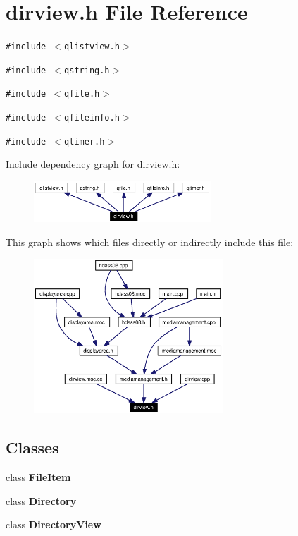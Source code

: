 \section{dirview.h File Reference}
\label{dirview_8h}


{\tt \#include $<$qlistview.h$>$}\par
{\tt \#include $<$qstring.h$>$}\par
{\tt \#include $<$qfile.h$>$}\par
{\tt \#include $<$qfileinfo.h$>$}\par
{\tt \#include $<$qtimer.h$>$}\par


Include dependency graph for dirview.h:\begin{figure}[H]
\begin{center}
\leavevmode
\includegraphics[width=188pt]{dirview_8h__incl}
\end{center}
\end{figure}


This graph shows which files directly or indirectly include this file:\begin{figure}[H]
\begin{center}
\leavevmode
\includegraphics[width=201pt]{dirview_8h__dep__incl}
\end{center}
\end{figure}
\subsection*{Classes}
\begin{CompactItemize}
\item 
class {\bf File\-Item}
\item 
class {\bf Directory}
\item 
class {\bf Directory\-View}
\end{CompactItemize}
